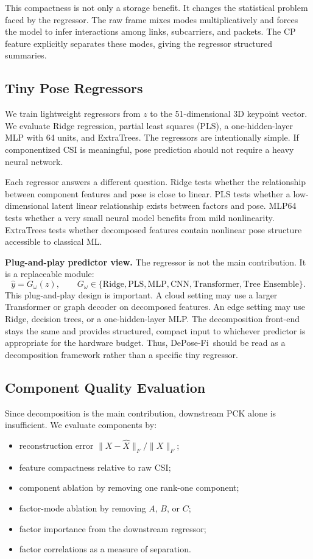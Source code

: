 \documentclass[letterpaper]{article}
\newcommand{\method}{DePose-Fi}
\begin{document}
This compactness is not only a storage benefit. It changes the statistical problem faced by the regressor. The raw frame mixes modes multiplicatively and forces the model to infer interactions among links, subcarriers, and packets. The CP feature explicitly separates these modes, giving the regressor structured summaries.

\subsection{Tiny Pose Regressors}

We train lightweight regressors from $z$ to the 51-dimensional 3D keypoint vector. We evaluate Ridge regression, partial least squares (PLS), a one-hidden-layer MLP with 64 units, and ExtraTrees. The regressors are intentionally simple. If componentized CSI is meaningful, pose prediction should not require a heavy neural network.

Each regressor answers a different question. Ridge tests whether the relationship between component features and pose is close to linear. PLS tests whether a low-dimensional latent linear relationship exists between factors and pose. MLP64 tests whether a very small neural model benefits from mild nonlinearity. ExtraTrees tests whether decomposed features contain nonlinear pose structure accessible to classical ML.

\textbf{Plug-and-play predictor view.}
The regressor is not the main contribution. It is a replaceable module:
\begin{equation}
\hat{y}=G_\omega(z),\qquad
G_\omega\in\{\text{Ridge},\text{PLS},\text{MLP},\text{CNN},\text{Transformer},\text{Tree Ensemble}\}.
\end{equation}
This plug-and-play design is important. A cloud setting may use a larger Transformer or graph decoder on decomposed features. An edge setting may use Ridge, decision trees, or a one-hidden-layer MLP. The decomposition front-end stays the same and provides structured, compact input to whichever predictor is appropriate for the hardware budget. Thus, \method\ should be read as a decomposition framework rather than a specific tiny regressor.

\subsection{Component Quality Evaluation}

Since decomposition is the main contribution, downstream PCK alone is insufficient. We evaluate components by:
\begin{itemize}
    \item reconstruction error $\|X-\hat{X}\|_F/\|X\|_F$;
    \item feature compactness relative to raw CSI;
    \item component ablation by removing one rank-one component;
    \item factor-mode ablation by removing $A$, $B$, or $C$;
    \item factor importance from the downstream regressor;
    \item factor correlations as a measure of separation.
\end{itemize}
\end{document}
